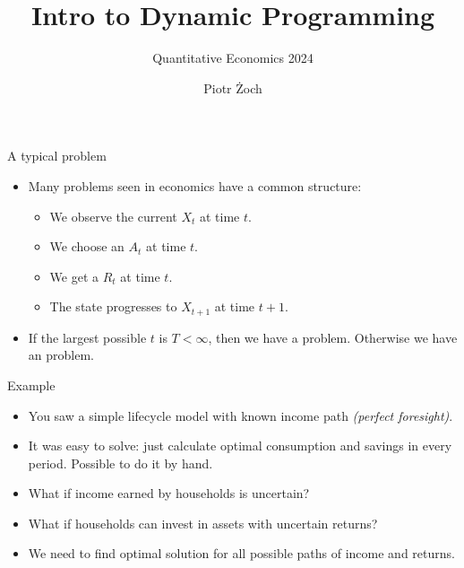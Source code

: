 \documentclass[11pt,xcolor={dvipsnames},aspectratio=159,hyperref={pdftex,pdfpagemode=UseNone,hidelinks,pdfdisplaydoctitle=true},usepdftitle=false]{beamer}
\begin{document}
\title{Intro to Dynamic Programming}
\subtitle{Quantitative Economics 2024}

\author{Piotr Żoch}%
\frame{\titlepage}

\begin{frame}{A typical problem}   

\begin{itemize}    
   \item  Many problems seen in economics have a common structure:
\begin{itemize}
    \item We observe the current  $X_t$ at time $t$.
    \item We choose an  $A_t$ at time $t$.
    \item We get a  $R_{t}$ at time $t$.
    \item The state progresses to $X_{t+1}$ at time $t+1$.
\end{itemize}
\item If the largest possible $t$ is $T<\infty$, then we have a  problem. Otherwise we have an  problem.
\end{itemize}
\end{frame}

\begin{frame}{Example}   
    \begin{itemize}
    \item  You saw a simple lifecycle model with known income path \emph{(perfect foresight)}.
    \item  It was easy to solve: just calculate optimal consumption and savings in every period. Possible to do it by hand. 
    \item  What if income earned by households is uncertain? 
    \item  What if households can invest in assets with uncertain returns? 
    \item  We need to find optimal solution for all possible paths of income and returns. 
\end{itemize}
\end{frame}
\end{document}
